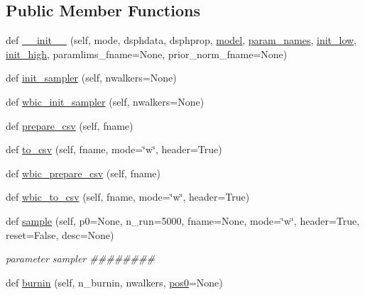 \subsection*{Public Member Functions}
\begin{DoxyCompactItemize}
\item 
def \hyperlink{classsampler_1_1Sampler_a0ebbb93e5c948bc426658cbdc92bfd12}{\+\_\+\+\_\+init\+\_\+\+\_\+} (self, mode, dsphdata, dsphprop, \hyperlink{classsampler_1_1Sampler_a5582a0d537f1aa6f2c4eca9cb7e00859}{model}, \hyperlink{classsampler_1_1Sampler_a63de348f6e0cd91f24e09e66bfe160d4}{param\+\_\+names}, \hyperlink{classsampler_1_1Sampler_a8d5d2c3f85eace580c0633b79de6a3f2}{init\+\_\+low}, \hyperlink{classsampler_1_1Sampler_a6f7037a873847e97098dc065a329d0a3}{init\+\_\+high}, paramlims\+\_\+fname=None, prior\+\_\+norm\+\_\+fname=None)
\item 
def \hyperlink{classsampler_1_1Sampler_aebf7df56d9b2f3bb74c0809bd4ce97d1}{init\+\_\+sampler} (self, nwalkers=None)
\item 
def \hyperlink{classsampler_1_1Sampler_a4e540da7daf591f96268bd3090018679}{wbic\+\_\+init\+\_\+sampler} (self, nwalkers=None)
\item 
def \hyperlink{classsampler_1_1Sampler_ad8e9c065a95873230d9e0310f1b893cc}{prepare\+\_\+csv} (self, fname)
\item 
def \hyperlink{classsampler_1_1Sampler_a57168d6c5801b89109e2a2cd7d7ff4ce}{to\+\_\+csv} (self, fname, mode=\char`\"{}w\char`\"{}, header=True)
\item 
def \hyperlink{classsampler_1_1Sampler_a92faf5125f59ded708dc71303d4938ac}{wbic\+\_\+prepare\+\_\+csv} (self, fname)
\item 
def \hyperlink{classsampler_1_1Sampler_a6ade3671106e25577cd51ea1a055b680}{wbic\+\_\+to\+\_\+csv} (self, fname, mode=\char`\"{}w\char`\"{}, header=True)
\item 
def \hyperlink{classsampler_1_1Sampler_a9403aa08f08af30f703b7b507431d7a9}{sample} (self, p0=None, n\+\_\+run=5000, fname=None, mode=\char`\"{}w\char`\"{}, header=True, reset=False, desc=None)
\begin{DoxyCompactList}\small\item\em parameter sampler \#\#\#\#\#\#\#\# \end{DoxyCompactList}\item 
def \hyperlink{classsampler_1_1Sampler_a0520c9a624d5abc9edd3e379d1b66021}{burnin} (self, n\+\_\+burnin, nwalkers, \hyperlink{classsampler_1_1Sampler_ad81b8f4bc5bc8925873719991006acd8}{pos0}=None)
\item 

\end{DoxyCompactItemize}
